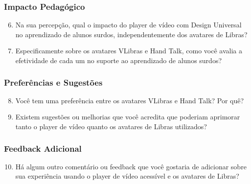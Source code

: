 \subsubsection*{Impacto Pedagógico}
\begin{enumerate}
    \setcounter{enumi}{5}
    \item Na sua percepção, qual o impacto do player de vídeo com Design Universal no aprendizado de alunos surdos, independentemente dos avatares de Libras?
    \item Especificamente sobre os avatares VLibras e Hand Talk, como você avalia a efetividade de cada um no suporte ao aprendizado de alunos surdos?
\end{enumerate}

\subsubsection*{Preferências e Sugestões}
\begin{enumerate}
    \setcounter{enumi}{7}
    \item Você tem uma preferência entre os avatares VLibras e Hand Talk? Por quê?
    \item Existem sugestões ou melhorias que você acredita que poderiam aprimorar tanto o player de vídeo quanto os avatares de Libras utilizados?
\end{enumerate}

\subsubsection*{Feedback Adicional}
\begin{enumerate}
    \setcounter{enumi}{9}
    \item Há algum outro comentário ou feedback que você gostaria de adicionar sobre sua experiência usando o player de vídeo acessível e os avatares de Libras?
\end{enumerate}
